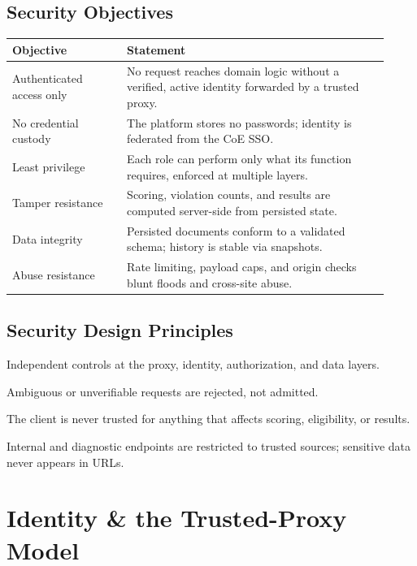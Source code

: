 \documentclass[12pt,a4paper,oneside]{report}
\begin{document}
\section{Security Objectives}
\begin{longtable}{@{}p{0.28\linewidth} p{0.64\linewidth}@{}}
\toprule
\textbf{Objective} & \textbf{Statement}\\
\midrule
\endhead
Authenticated access only & No request reaches domain logic without a verified, active identity forwarded by a trusted proxy.\\
No credential custody & The platform stores no passwords; identity is federated from the CoE SSO.\\
Least privilege & Each role can perform only what its function requires, enforced at multiple layers.\\
Tamper resistance & Scoring, violation counts, and results are computed server-side from persisted state.\\
Data integrity & Persisted documents conform to a validated schema; history is stable via snapshots.\\
Abuse resistance & Rate limiting, payload caps, and origin checks blunt floods and cross-site abuse.\\
\bottomrule
\end{longtable}

\section{Security Design Principles}
\begin{description}[leftmargin=1.6em,style=nextline]
  \item[Defence in depth] Independent controls at the proxy, identity,
        authorization, and data layers.
  \item[Fail closed] Ambiguous or unverifiable requests are rejected, not
        admitted.
  \item[Server-side authority] The client is never trusted for anything that
        affects scoring, eligibility, or results.
  \item[Minimal exposure] Internal and diagnostic endpoints are restricted to
        trusted sources; sensitive data never appears in URLs.
\end{description}

\chapter{Identity \& the Trusted-Proxy Model}
\end{document}
